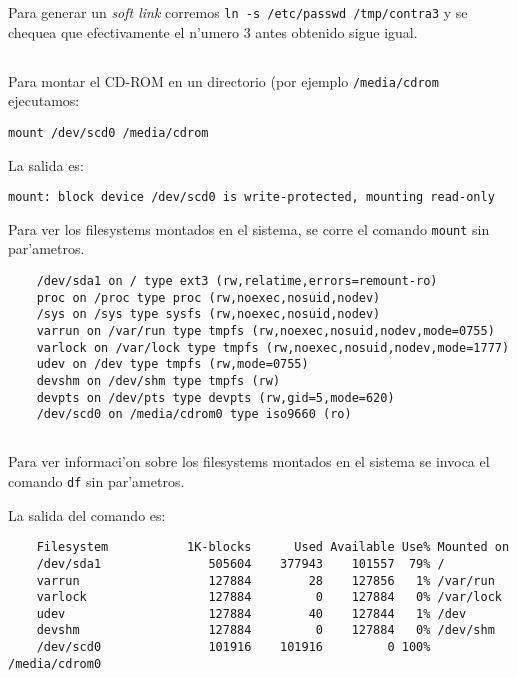 Para generar un \emph{soft link} corremos \texttt{ln -s /etc/passwd /tmp/contra3} y se chequea que efectivamente el n'umero 3 antes obtenido sigue igual.

\subsection{}
Para montar el CD-ROM en un directorio (por ejemplo \texttt{/media/cdrom} ejecutamos:

\texttt{mount /dev/scd0 /media/cdrom}

La salida es:

\texttt{mount: block device /dev/scd0 is write-protected, mounting read-only}
		
Para ver los filesystems montados en el sistema, se corre el comando \texttt{mount} sin par'ametros.
      \begin{mylisting}
      \begin{verbatim}
	/dev/sda1 on / type ext3 (rw,relatime,errors=remount-ro)
	proc on /proc type proc (rw,noexec,nosuid,nodev)
	/sys on /sys type sysfs (rw,noexec,nosuid,nodev)
	varrun on /var/run type tmpfs (rw,noexec,nosuid,nodev,mode=0755)
	varlock on /var/lock type tmpfs (rw,noexec,nosuid,nodev,mode=1777)
	udev on /dev type tmpfs (rw,mode=0755)
	devshm on /dev/shm type tmpfs (rw)
	devpts on /dev/pts type devpts (rw,gid=5,mode=620)
	/dev/scd0 on /media/cdrom0 type iso9660 (ro)
      \end{verbatim}
      \end{mylisting}

\subsection{}
Para ver informaci'on sobre los filesystems montados en el sistema se invoca el comando \texttt{df} sin par'ametros.

La salida del comando es:
       \begin{mylisting}
       \begin{verbatim}
	Filesystem           1K-blocks      Used Available Use% Mounted on
	/dev/sda1               505604    377943    101557  79% /
	varrun                  127884        28    127856   1% /var/run
	varlock                 127884         0    127884   0% /var/lock
	udev                    127884        40    127844   1% /dev
	devshm                  127884         0    127884   0% /dev/shm
	/dev/scd0               101916    101916         0 100% /media/cdrom0
       \end{verbatim}
       \end{mylisting}

